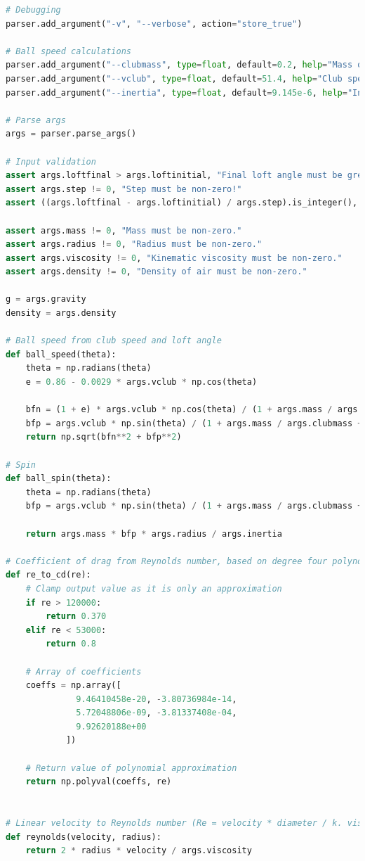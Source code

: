 \documentclass[12pt]{article}
\begin{document}
\begin{lstlisting}[language=Python, caption=Python model), style=PythonStyle, basicstyle=\tiny]
# Debugging
parser.add_argument("-v", "--verbose", action="store_true")

# Ball speed calculations
parser.add_argument("--clubmass", type=float, default=0.2, help="Mass of club head (kg)")
parser.add_argument("--vclub", type=float, default=51.4, help="Club speed (m/s)")
parser.add_argument("--inertia", type=float, default=9.145e-6, help="Inertia of golf ball")

# Parse args
args = parser.parse_args()

# Input validation
assert args.loftfinal > args.loftinitial, "Final loft angle must be gretaer than initial loft angle!"
assert args.step != 0, "Step must be non-zero!"
assert ((args.loftfinal - args.loftinitial) / args.step).is_integer(), "Step size must divide the change in loft angle!"

assert args.mass != 0, "Mass must be non-zero."
assert args.radius != 0, "Radius must be non-zero."
assert args.viscosity != 0, "Kinematic viscosity must be non-zero."
assert args.density != 0, "Density of air must be non-zero."

g = args.gravity
density = args.density

# Ball speed from club speed and loft angle
def ball_speed(theta):
	theta = np.radians(theta)
	e = 0.86 - 0.0029 * args.vclub * np.cos(theta)

	bfn = (1 + e) * args.vclub * np.cos(theta) / (1 + args.mass / args.clubmass)
	bfp = args.vclub * np.sin(theta) / (1 + args.mass / args.clubmass + (args.mass * args.radius**2 / args.inertia))
	return np.sqrt(bfn**2 + bfp**2)

# Spin
def ball_spin(theta):
	theta = np.radians(theta)
	bfp = args.vclub * np.sin(theta) / (1 + args.mass / args.clubmass + (args.mass * args.radius**2 / args.inertia))

	return args.mass * bfp * args.radius / args.inertia

# Coefficient of drag from Reynolds number, based on degree four polynomial.
def re_to_cd(re):
	# Clamp output value as it is only an approximation
	if re > 120000:
		return 0.370
	elif re < 53000:
		return 0.8

	# Array of coefficients
	coeffs = np.array([
			  9.46410458e-20, -3.80736984e-14,
			  5.72048806e-09, -3.81337408e-04,
			  9.92620188e+00
			])

	# Return value of polynomial approximation
	return np.polyval(coeffs, re)


# Linear velocity to Reynolds number (Re = velocity * diameter / k. viscosity)
def reynolds(velocity, radius):
	return 2 * radius * velocity / args.viscosity



\end{lstlisting}
\end{document}
